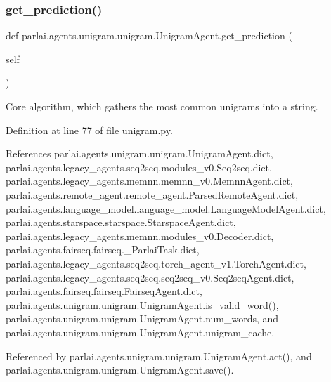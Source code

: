 \subsubsection{\texorpdfstring{get\+\_\+prediction()}{get\_prediction()}}
{\footnotesize\ttfamily def parlai.\+agents.\+unigram.\+unigram.\+Unigram\+Agent.\+get\+\_\+prediction (\begin{DoxyParamCaption}\item[{}]{self }\end{DoxyParamCaption})}

\begin{DoxyVerb}Core algorithm, which gathers the most common unigrams into a string.
\end{DoxyVerb}
 

Definition at line 77 of file unigram.\+py.



References parlai.\+agents.\+unigram.\+unigram.\+Unigram\+Agent.\+dict, parlai.\+agents.\+legacy\+\_\+agents.\+seq2seq.\+modules\+\_\+v0.\+Seq2seq.\+dict, parlai.\+agents.\+legacy\+\_\+agents.\+memnn.\+memnn\+\_\+v0.\+Memnn\+Agent.\+dict, parlai.\+agents.\+remote\+\_\+agent.\+remote\+\_\+agent.\+Parsed\+Remote\+Agent.\+dict, parlai.\+agents.\+language\+\_\+model.\+language\+\_\+model.\+Language\+Model\+Agent.\+dict, parlai.\+agents.\+starspace.\+starspace.\+Starspace\+Agent.\+dict, parlai.\+agents.\+legacy\+\_\+agents.\+memnn.\+modules\+\_\+v0.\+Decoder.\+dict, parlai.\+agents.\+fairseq.\+fairseq.\+\_\+\+Parlai\+Task.\+dict, parlai.\+agents.\+legacy\+\_\+agents.\+seq2seq.\+torch\+\_\+agent\+\_\+v1.\+Torch\+Agent.\+dict, parlai.\+agents.\+legacy\+\_\+agents.\+seq2seq.\+seq2seq\+\_\+v0.\+Seq2seq\+Agent.\+dict, parlai.\+agents.\+fairseq.\+fairseq.\+Fairseq\+Agent.\+dict, parlai.\+agents.\+unigram.\+unigram.\+Unigram\+Agent.\+is\+\_\+valid\+\_\+word(), parlai.\+agents.\+unigram.\+unigram.\+Unigram\+Agent.\+num\+\_\+words, and parlai.\+agents.\+unigram.\+unigram.\+Unigram\+Agent.\+unigram\+\_\+cache.



Referenced by parlai.\+agents.\+unigram.\+unigram.\+Unigram\+Agent.\+act(), and parlai.\+agents.\+unigram.\+unigram.\+Unigram\+Agent.\+save().

